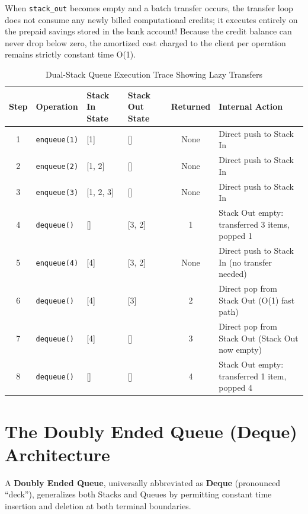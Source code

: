 \documentclass[10pt,journal,compsoc,onecolumn]{IEEEtran}
\begin{document}
When \texttt{stack\_out} becomes empty and a batch transfer occurs, the transfer loop does not consume any newly billed computational credits; it executes entirely on the prepaid savings stored in the bank account! Because the credit balance can never drop below zero, the amortized cost charged to the client per operation remains strictly constant time O(1).

\begin{table}[htbp]
\centering
\caption{Dual-Stack Queue Execution Trace Showing Lazy Transfers}
\label{tab:twostack_trace}
\begin{tabular}{cp{2.2cm}p{2.2cm}p{2.2cm}cp{5.2cm}}
\toprule
\textbf{Step} & \textbf{Operation} & \textbf{Stack In State} & \textbf{Stack Out State} & \textbf{Returned} & \textbf{Internal Action} \\
\midrule
1 & \texttt{enqueue(1)} & [1] & [] & None & Direct push to Stack In \\
2 & \texttt{enqueue(2)} & [1, 2] & [] & None & Direct push to Stack In \\
3 & \texttt{enqueue(3)} & [1, 2, 3] & [] & None & Direct push to Stack In \\
4 & \texttt{dequeue()} & [] & [3, 2] & 1 & Stack Out empty: transferred 3 items, popped 1 \\
5 & \texttt{enqueue(4)} & [4] & [3, 2] & None & Direct push to Stack In (no transfer needed) \\
6 & \texttt{dequeue()} & [4] & [3] & 2 & Direct pop from Stack Out (O(1) fast path) \\
7 & \texttt{dequeue()} & [4] & [] & 3 & Direct pop from Stack Out (Stack Out now empty) \\
8 & \texttt{dequeue()} & [] & [] & 4 & Stack Out empty: transferred 1 item, popped 4 \\
\bottomrule
\end{tabular}
\end{table}

\section{The Doubly Ended Queue (Deque) Architecture}
\label{sec:deque}

A \textbf{Doubly Ended Queue}, universally abbreviated as \textbf{Deque} (pronounced ``deck''), generalizes both Stacks and Queues by permitting constant time insertion and deletion at both terminal boundaries.
\end{document}
